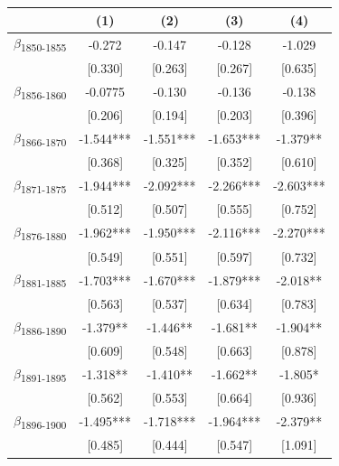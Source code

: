 {
\def\sym#1{\ifmmode^{#1}\else\(^{#1}\)\fi}
\begin{tabular}{l*{4}{c}}
\toprule
            &\multicolumn{1}{c}{(1)}   &\multicolumn{1}{c}{(2)}   &\multicolumn{1}{c}{(3)}   &\multicolumn{1}{c}{(4)}   \\
\midrule
$\beta$\textsubscript{1850-1855}&      -0.272   &      -0.147   &      -0.128   &      -1.029   \\
            &     [0.330]   &     [0.263]   &     [0.267]   &     [0.635]   \\
$\beta$\textsubscript{1856-1860}&     -0.0775   &      -0.130   &      -0.136   &      -0.138   \\
            &     [0.206]   &     [0.194]   &     [0.203]   &     [0.396]   \\
$\beta$\textsubscript{1866-1870}&      -1.544***&      -1.551***&      -1.653***&      -1.379** \\
            &     [0.368]   &     [0.325]   &     [0.352]   &     [0.610]   \\
$\beta$\textsubscript{1871-1875}&      -1.944***&      -2.092***&      -2.266***&      -2.603***\\
            &     [0.512]   &     [0.507]   &     [0.555]   &     [0.752]   \\
$\beta$\textsubscript{1876-1880}&      -1.962***&      -1.950***&      -2.116***&      -2.270***\\
            &     [0.549]   &     [0.551]   &     [0.597]   &     [0.732]   \\
$\beta$\textsubscript{1881-1885}&      -1.703***&      -1.670***&      -1.879***&      -2.018** \\
            &     [0.563]   &     [0.537]   &     [0.634]   &     [0.783]   \\
$\beta$\textsubscript{1886-1890}&      -1.379** &      -1.446** &      -1.681** &      -1.904** \\
            &     [0.609]   &     [0.548]   &     [0.663]   &     [0.878]   \\
$\beta$\textsubscript{1891-1895}&      -1.318** &      -1.410** &      -1.662** &      -1.805*  \\
            &     [0.562]   &     [0.553]   &     [0.664]   &     [0.936]   \\
$\beta$\textsubscript{1896-1900}&      -1.495***&      -1.718***&      -1.964***&      -2.379** \\
            &     [0.485]   &     [0.444]   &     [0.547]   &     [1.091]   \\

\end{tabular}}
